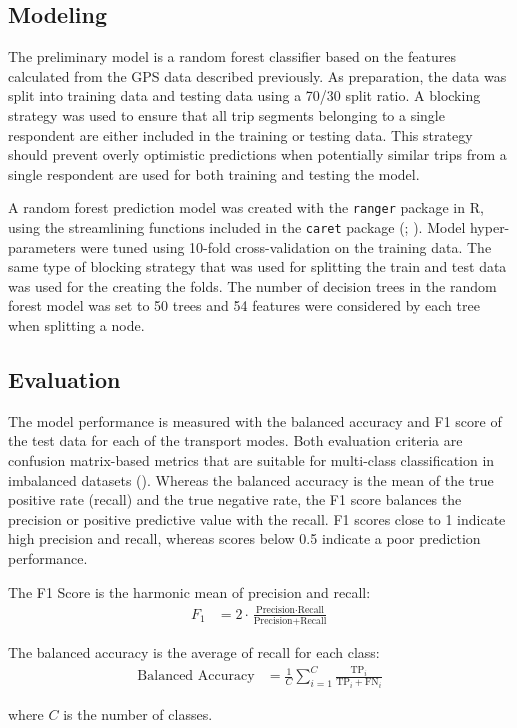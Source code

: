 \documentclass[10pt, a4paper, titlepage, hidelinks]{article}
\begin{document}
\subsection{Modeling}

The preliminary model is a random forest classifier based on the features calculated from the GPS data described previously. As preparation, the data was split into training data and testing data using a 70/30 split ratio. A blocking strategy was used to ensure that all trip segments belonging to a single respondent are either included in the training or testing data. This strategy should prevent overly optimistic predictions when potentially similar trips from a single respondent are used for both training and testing the model.

A random forest prediction model was created with the \texttt{ranger} package in R, using the streamlining functions included in the \texttt{caret} package (\cite{ranger}; \cite{caret}). Model hyper-parameters were tuned using 10-fold cross-validation on the training data. The same type of blocking strategy that was used for splitting the train and test data was used for the creating the folds. The number of decision trees in the random forest model was set to 50 trees and 54 features were considered by each tree when splitting a node.

\subsection{Evaluation}

The model performance is measured with the balanced accuracy and F1 score of the test data for each of the transport modes. Both evaluation criteria are confusion matrix-based metrics that are suitable for multi-class classification in imbalanced datasets (\cite{luque2019}). Whereas the balanced accuracy is the mean of the true positive rate (recall) and the true negative rate, the F1 score balances the precision or positive predictive value with the recall. F1 scores close to 1 indicate high precision and recall, whereas scores below 0.5 indicate a poor prediction performance.

The F1 Score is the harmonic mean of precision and recall:
\begin{align*}
F_1 &= 2 \cdot \frac{\text{Precision} \cdot \text{Recall}}{\text{Precision} + \text{Recall}}
\end{align*}

The balanced accuracy is the average of recall for each class:
\begin{align*}
\text{Balanced Accuracy} &= \frac{1}{C} \sum_{i=1}^{C} \frac{\text{TP}_i}{\text{TP}_i + \text{FN}_i}
\end{align*}
\begin{center}
where $C$ is the number of classes.
\end{center}
\end{document}
